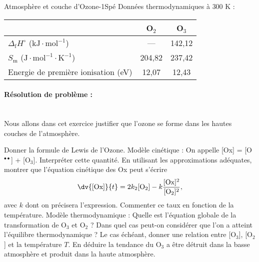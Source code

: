 \begin{exercise}{Atmosphère et couche d'Ozone}{-1}{Spé}
Données thermodynamiques à $300$ K :
\begin{center}\begin{tabular}{l|cc}
    & O$_2$ & O$_3$ \\ \hline
    $\Delta_\text{f}H^\circ$ ($\mathrm{kJ\cdot mol^{-1}}$) & --- & 142,12  \\
    $S_\text{m}$ ($\mathrm{J\cdot mol^{-1}\cdot K^{-1}}$) & 204,82 & 237,42 \\
    Energie de première ionisation (eV) & 12,07 & 12,43 \\ \hline\hline
\end{tabular}\end{center}

\paragraph{Résolution de problème :}~\\
Nous allons dans cet exercice justifier que l’ozone se forme dans les hautes couches de l’atmosphère.

\begin{questions}
    \question Donner la formule de Lewis de l'Ozone.
    \question\textsf{Modèle cinétique :} On appelle [Ox] = [O$^{\bullet\bullet}$] + [O$_3$].  Interpréter cette quantité.
    \question En utilisant les approximations adéquates, montrer que l'équation cinétique des Ox peut s'écrire
    $$\dv{\mathrm{[Ox]}}{t} = 2 k_2 \mathrm{[O_2]} - k\dfrac{\mathrm{[Ox]^2}}{\mathrm{[O_2]^2}},$$
    avec $k$ dont on précisera l'expression. Commenter ce taux en fonction de la température.
    \question\textsf{Modèle thermodynamique :} Quelle est l'équation globale de la transformation de O$_3$ et O$_2$ ? Dans quel cas peut-on considérer que l'on a atteint l'équilibre thermodynamique ?
    \question Le cas échéant, donner une relation entre [O$_3$], [O$_2$] et la température $T$. En déduire la tendance du O$_3$ a être détruit dans la basse atmosphère et produit dans la haute atmosphère.
\end{questions}

\end{exercise}
